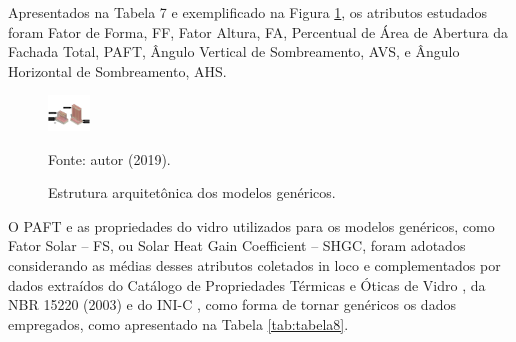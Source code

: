 \noindent Apresentados na Tabela 7 e exemplificado na Figura \ref{fig:figura9}, os atributos estudados foram Fator de 
Forma, FF, Fator Altura, FA, Percentual de Área de Abertura da Fachada Total, PAFT, Ângulo 
Vertical de Sombreamento, AVS, e Ângulo Horizontal de Sombreamento, AHS.
    \begin{figure}[ht]
        \centering
        \caption{\small Estrutura arquitetônica dos modelos genéricos.}
        \includegraphics[width=0.1\textwidth]{figures/fig11_8-19-2pav.png}
        \begin{flushleft}
            \par \small Fonte: autor (2019).
        \end{flushleft}
        \label{fig:figura9}
    \end{figure}\newline
\noindent O PAFT e as propriedades do vidro utilizados para os modelos genéricos, como Fator Solar – FS, 
ou Solar Heat Gain Coefficient – SHGC, foram adotados considerando as médias desses atributos 
coletados in loco e complementados por dados extraídos do Catálogo de Propriedades Térmicas e 
Óticas de Vidro \cite{CentroBrasileirodeEficienciaEnergeticaemEdificacoesCB3E2015,AssociacaoBrasileiradeNormasTecnicas-ABNT2003}, da NBR 15220 (2003) e do INI-C \cite{InstitutoNacionaldeMetrologiaNormalizacaoeQualidadeIndustrial-INMETRO2018}, 
como forma de tornar genéricos os dados empregados, como apresentado na Tabela \ref{tab:tabela8}.\vspace*{0.3cm} \newline
